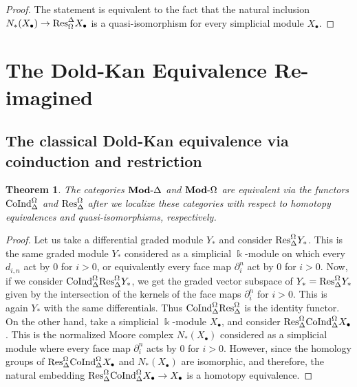 \documentclass[a4paper,11pt]{amsart}
\newtheorem{theorem}{Theorem}[section]
\theoremstyle{definition}
\newcommand{\rmod}[1]{\text{{\bf Mod}-}{#1}}
\newcommand{\Res}{\text{\rm Res}}
\newcommand{\CoInd}{\text{\rm CoInd}}
\newcommand{\Simp}{{\Delta}}
\newcommand{\Diff}{{\Omega}}
\begin{document}
 \begin{proof}
  The statement is equivalent to the fact that the natural inclusion $N_*(X_\bullet) \to \Res^{\Simp}_{\Diff} X_\bullet$ is a quasi-isomorphism for every simplicial module $X_\bullet$.
 \end{proof}

\section{The Dold-Kan Equivalence Re-imagined}

\subsection{The classical Dold-Kan equivalence via coinduction and restriction}

 \begin{theorem}\label{thm:adjoint-pair}
  The categories $\rmod{\Simp}$ and $\rmod{\Diff}$ are equivalent via the functors $\CoInd_{\Simp}^{\Diff}$ and $\Res^{\Diff}_{\Simp}$ after we localize these categories with respect to homotopy equivalences and quasi-isomorphisms, respectively.
 \end{theorem}

 \begin{proof}
  Let us take a differential graded module $Y_*$ and consider $\Res^{\Diff}_{\Simp}Y_*$.  This is the same graded module $Y_*$ considered as a simplicial $\Bbbk$-module on which every $d_{i,n}$ act by 0 for $i>0$, or equivalently every face map $\partial^n_i$ act by 0 for $i>0$.  Now, if we consider $\CoInd_{\Simp}^{\Diff}\Res^{\Diff}_{\Simp}Y_*$, we get the graded vector subspace of $Y_* = \Res^{\Diff}_{\Simp}Y_*$ given by the intersection of the kernels of the face maps $\partial^n_i$ for $i>0$. This is again $Y_*$ with the same differentials. Thus $\CoInd_{\Simp}^{\Diff}\Res^{\Diff}_{\Simp}$ is the identity functor. On the other hand, take a simplicial $\Bbbk$-module $X_\bullet$, and consider $\Res^{\Diff}_{\Simp}\CoInd_{\Simp}^{\Diff}X_\bullet$. This is the normalized Moore complex $N_*(X_\bullet)$ considered as a simplicial module where every face map $\partial^n_i$ acts by $0$ for $i>0$. However, since the homology groups of $\Res^{\Diff}_{\Simp}\CoInd_{\Simp}^{\Diff}X_\bullet$ and $N_*(X_\bullet)$ are isomorphic, and therefore, the natural embedding $\Res^{\Diff}_{\Simp}\CoInd_{\Simp}^{\Diff}X_\bullet \to X_\bullet$ is a homotopy equivalence.
 \end{proof}
\end{document}
